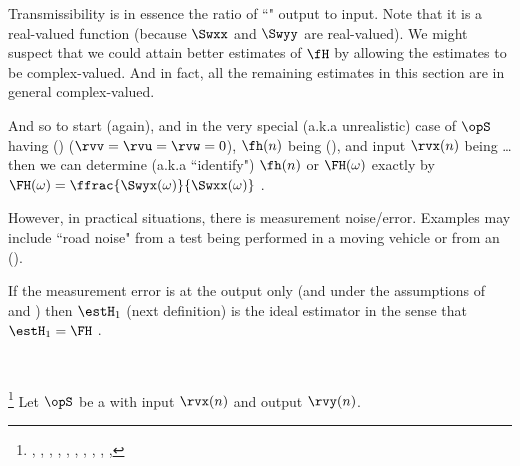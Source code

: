 Transmissibility is in essence the ratio of ``"  
output to  input.
Note that it is a real-valued function (because $\Swxx$ and $\Swyy$ are real-valued).
We might suspect that we could attain better estimates of $\fH$ by allowing the estimates to be complex-valued. %
And in fact, all the remaining estimates in this section are in general complex-valued.

And so to start (again), and in the very special (a.k.a unrealistic) case of $\opS$ having 
 ()
($\rvv=\rvu=\rvw=0$),
$\fh(n)$ being  (),
and input $\rvx(n)$ being \ldots
then we can determine (a.k.a ``identify") $\fh(n)$ or $\FH(\omega)$
exactly by $\FH(\omega)=\ffrac{\Swyx(\omega)}{\Swxx(\omega)}$ .

However, in practical situations, there is measurement noise/error. %
Examples may include
``road noise" from a test being performed in a moving vehicle or  from an 
 ().

\begin{minipage}{\tw-70mm}
If the measurement error is at the output only (and under the assumptions of  and )
then $\estH_1$ (next definition) is the ideal estimator in the sense that $\estH_1=\FH$ .
\end{minipage}
\hfill{}
\\
\begin{definition}
\footnote{
  ,
  ,
  ,
  ,
  ,
  ,
  ,
  ,
  ,
  ,
  }
\label{def:H1}
Let $\opS$ be a  with input $\rvx(n)$ and output $\rvy(n)$.
\end{definition}

